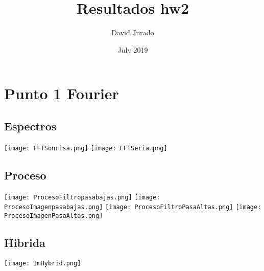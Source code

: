\documentclass{article}
\title{Resultados hw2}
\author{David Jurado }
\date{July 2019}
\begin{document}
\maketitle

\section{Punto 1 Fourier}

\subsection{Espectros}
\texttt{[image: FFTSonrisa.png]}
\texttt{[image: FFTSeria.png]}

\subsection{Proceso}
\texttt{[image: ProcesoFiltropasabajas.png]}
\texttt{[image: ProcesoImagenpasabajas.png]}
\texttt{[image: ProcesoFiltroPasaAltas.png]}
\texttt{[image: ProcesoImagenPasaAltas.png]}

\subsection{Hibrida}
\texttt{[image: ImHybrid.png]}
\end{document}
